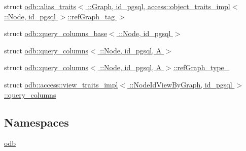 \begin{DoxyCompactItemize}
\item 
struct \hyperlink{structodb_1_1alias__traits_3_01_1_1_graph_00_01id__pgsql_00_01access_1_1object__traits__impl_3_0e5732bb3042e64de1a6d81be59d8f1ee}{odb\+::alias\+\_\+traits$<$ \+::\+Graph, id\+\_\+pgsql, access\+::object\+\_\+traits\+\_\+impl$<$ \+::\+Node, id\+\_\+pgsql $>$\+::ref\+Graph\+\_\+tag $>$}
\item 
struct \hyperlink{structodb_1_1query__columns__base_3_01_1_1_node_00_01id__pgsql_01_4}{odb\+::query\+\_\+columns\+\_\+base$<$ \+::\+Node, id\+\_\+pgsql $>$}
\item 
struct \hyperlink{structodb_1_1query__columns_3_01_1_1_node_00_01id__pgsql_00_01_a_01_4}{odb\+::query\+\_\+columns$<$ \+::\+Node, id\+\_\+pgsql, A $>$}
\item 
struct \hyperlink{structodb_1_1query__columns_3_01_1_1_node_00_01id__pgsql_00_01_a_01_4_1_1ref_graph__type__}{odb\+::query\+\_\+columns$<$ \+::\+Node, id\+\_\+pgsql, A $>$\+::ref\+Graph\+\_\+type\+\_\+}
\item 
struct \hyperlink{structodb_1_1access_1_1view__traits__impl_3_01_1_1_node_id_view_by_graph_00_01id__pgsql_01_4_1_1query__columns}{odb\+::access\+::view\+\_\+traits\+\_\+impl$<$ \+::\+Node\+Id\+View\+By\+Graph, id\+\_\+pgsql $>$\+::query\+\_\+columns}
\end{DoxyCompactItemize}
\subsection*{Namespaces}
\begin{DoxyCompactItemize}
\item 
 \hyperlink{namespaceodb}{odb}
\end{DoxyCompactItemize}
